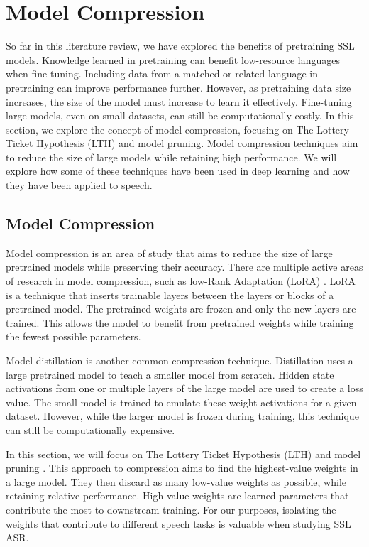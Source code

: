 \newpage
\section{Model Compression}\label{lr_sec:model_compression}
So far in this literature review, we have explored the benefits of pretraining SSL models. Knowledge learned in pretraining can benefit low-resource languages when fine-tuning. Including data from a matched or related language in pretraining can improve performance further. However, as pretraining data size increases, the size of the model must increase to learn it effectively. Fine-tuning large models, even on small datasets, can still be computationally costly. In this section, we explore the concept of model compression, focusing on The Lottery Ticket Hypothesis (LTH) and model pruning. Model compression techniques aim to reduce the size of large models while retaining high performance. We will explore how some of these techniques have been used in deep learning and how they have been applied to speech.  

\subsection{Model Compression}
Model compression is an area of study that aims to reduce the size of large pretrained models while preserving their accuracy. There are multiple active areas of research in model compression, such as low-Rank Adaptation (LoRA) \cite{hu2021lora}. LoRA \cite{hu2021lora} is a technique that inserts trainable layers between the layers or blocks of a pretrained model. The pretrained weights are frozen and only the new layers are trained. This allows the model to benefit from pretrained weights while training the fewest possible parameters.

Model distillation \cite{distillation} is another common compression technique. Distillation uses a large pretrained model to teach a smaller model from scratch. Hidden state activations from one or multiple layers of the large model are used to create a loss value. The small model is trained to emulate these weight activations for a given dataset. However, while the larger model is frozen during training, this technique can still be computationally expensive. 

In this section, we will focus on The Lottery Ticket Hypothesis (LTH) and model pruning \cite{han2015learning, frankle2018LTH}. This approach to compression aims to find the highest-value weights in a large model. They then discard as many low-value weights as possible, while retaining relative performance. High-value weights are learned parameters that contribute the most to downstream training. For our purposes, isolating the weights that contribute to different speech tasks is valuable when studying SSL ASR. 

